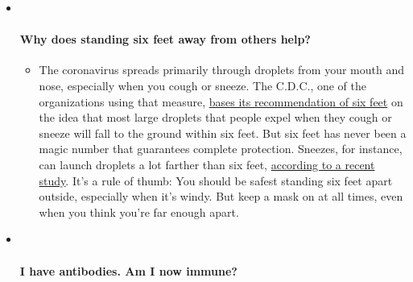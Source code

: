 \begin{itemize}
\item ~
  \hypertarget{why-does-standing-six-feet-away-from-others-help}{%
  \paragraph{Why does standing six feet away from others
  help?}\label{why-does-standing-six-feet-away-from-others-help}}

  \begin{itemize}
  \tightlist
  \item
    The coronavirus spreads primarily through droplets from your mouth
    and nose, especially when you cough or sneeze. The C.D.C., one of
    the organizations using that measure,
    \href{https://www.nytimes3xbfgragh.onion/2020/04/14/health/coronavirus-six-feet.html?action=click\&pgtype=Article\&state=default\&region=MAIN_CONTENT_3\&context=storylines_faq}{bases
    its recommendation of six feet} on the idea that most large droplets
    that people expel when they cough or sneeze will fall to the ground
    within six feet. But six feet has never been a magic number that
    guarantees complete protection. Sneezes, for instance, can launch
    droplets a lot farther than six feet,
    \href{https://jamanetwork.com/journals/jama/fullarticle/2763852}{according
    to a recent study}. It's a rule of thumb: You should be safest
    standing six feet apart outside, especially when it's windy. But
    keep a mask on at all times, even when you think you're far enough
    apart.
  \end{itemize}
\item ~
  \hypertarget{i-have-antibodies-am-i-now-immune}{%
  \paragraph{I have antibodies. Am I now
  immune?}\label{i-have-antibodies-am-i-now-immune}}


\end{itemize}

